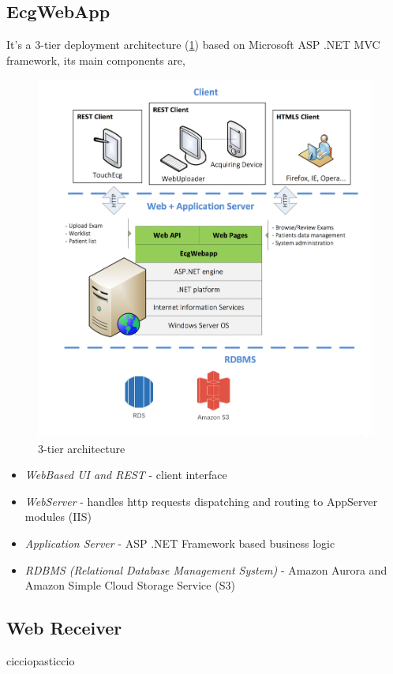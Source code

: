\subsection{EcgWebApp}
\label{subsection:ecgwebapp}
It's a 3-tier deployment architecture (\ref{fig:tiers_diagram}) based on Microsoft ASP .NET MVC framework, its main components are,
\begin{figure}[h]
    \includegraphics[width=\textwidth]{img/tiers_diagram}
    \caption{3-tier architecture}
    \label{fig:tiers_diagram}
\end{figure}
\begin{itemize}
    \item \textit{WebBased UI and REST} - client interface
    \item \textit{WebServer} - handles http requests dispatching and routing to AppServer modules (IIS)
    \item \textit{Application Server} - ASP .NET Framework based business logic
    \item \textit{RDBMS (Relational Database Management System)} - Amazon Aurora and Amazon Simple Cloud Storage Service (S3)
\end{itemize}

\subsection{Web Receiver}
cicciopasticcio
\label{subsection:webreceiver}
